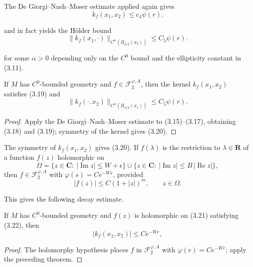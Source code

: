 The De Giorgi--Nash--Moser estimate applied again gives
\begin{equation}\tag{3.18}
 k_f(x_1,x_2)\le c_4\psi(r).
\end{equation}

and in fact yields the H\"older bound
\begin{equation}\tag{3.19}
 \bigl\|k_f(x_1,\cdot)\bigr\|_{C^\alpha(B_{a/2}(x_2))}\le C_5\psi(r).
\end{equation}

for some $\alpha>0$ depending only on the $C^0$ bound and the ellipticity constant in (3.11).

\begin{theorem}
\label{thm:c0-bounded-geometry-kernel-estimates}


If $M$ has $C^0$-bounded geometry and $f\in \mathcal{F}_2^{\varphi,A}$, then the kernel $k_f(x_1,x_2)$ satisfies (3.19) and
\begin{equation}\tag{3.20}
 \bigl\|k_f(\cdot,x_2)\bigr\|_{C^\alpha(B_{a/2}(x_1))}\le C_5\psi(r).
\end{equation}
\end{theorem}
\begin{proof}
\sketch Apply the De Giorgi--Nash--Moser estimate to (3.15)--(3.17), obtaining (3.18) and (3.19); symmetry of the kernel gives (3.20).
\end{proof}

The symmetry of $k_f(x_1,x_2)$ gives (3.20). If $f(\lambda)$ is the restriction to
$\lambda\in\mathbf R$ of a function $f(z)$ holomorphic on
\begin{equation}\tag{3.21}
 \Omega=\{z\in \mathbf{C}:\ |\operatorname{Im}z|\le W+\epsilon\}\cup\{z\in \mathbf{C}:\ |\operatorname{Im}z|\le B\,|\operatorname{Re}z|\},
\end{equation}
then $f\in \mathcal F_2^{\varphi,A}$ with $\varphi(s)=Ce^{-Ws}$, provided
\begin{equation}\tag{3.22}
 |f(z)|\le C(1+|z|)^m,\qquad z\in\Omega.
\end{equation}

This gives the following decay estimate.

\begin{corollary}
\label{cor:c0-bounded-geometry-exponential-decay}


If $M$ has $C^0$-bounded geometry and $f(z)$ is holomorphic on (3.21) satisfying (3.22), then
\begin{equation}\tag{3.23}
 |k_f(x_1,x_2)|\le Ce^{-Wr},
\end{equation}
\end{corollary}
\begin{proof}
\sketch The holomorphy hypothesis places $f$ in $\mathcal F_2^{\varphi,A}$ with $\varphi(r)=Ce^{-Wr}$; apply the preceding theorem.
\end{proof}

